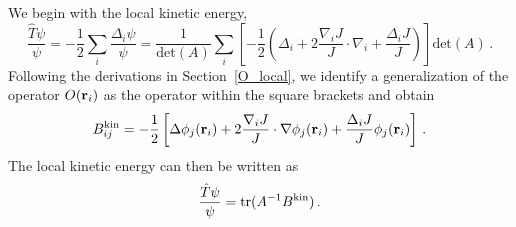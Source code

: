 \documentclass[aip,jcp,reprint,floatfix,onecolumn]{revtex4-1}
\def\det{\text{det}}
\def\tr{\text{tr}}
\begin{document}
We begin with the local kinetic energy,
\begin{equation}
\frac{\hat{T} \psi} {\psi}= -\frac{1}{2}\sum_i \frac{\Delta_i \psi}{\psi} =
\frac{1}{\det(A)}\sum_i\left[-\frac{1}{2}\left(\Delta_i  + 2\frac{\nabla_i J}{J}\cdot {\nabla_i } + \frac{\Delta_i J}{J} \right)\right]\det(A)\,.
\label{Jkin}
\end{equation}
Following the derivations in Section~\ref{O_local}, we identify a generalization of the operator $O({\bf r}_i)$ as the operator within the square brackets and obtain
\begin{equation}
B^{\rm kin}_{ij}= -\frac{1}{2} \left[
 \Delta \phi_j({\bf r}_i) + 2\frac{\nabla_i J}{J} \cdot \nabla \phi_j({\bf r}_i) + \frac{\Delta_i J}{J}  \phi_j({\bf r}_i) \right]\,.
\label{Bdef}
\end{equation}
The local kinetic energy can then be written as
\begin{equation}
\frac{\hat{T}    \psi}{\psi} =  \tr  (A^{-1} B^{\rm kin})\,.
\end{equation}
\end{document}
